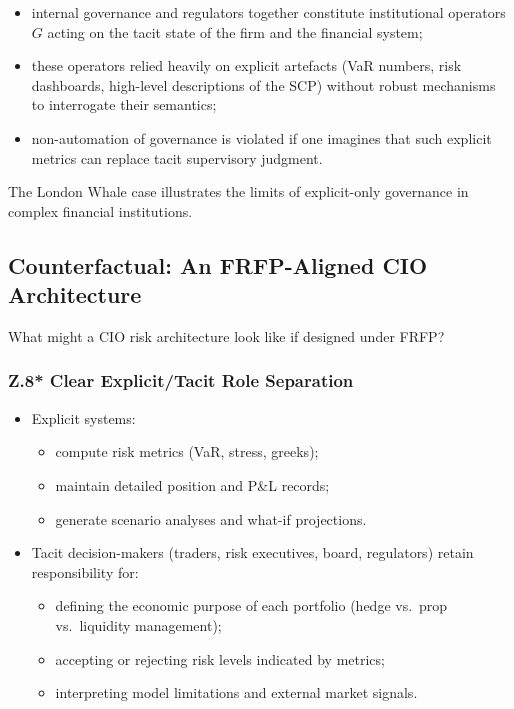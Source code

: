 \begin{itemize}
  \item internal governance and regulators together constitute institutional
        operators \(G\) acting on the tacit state of the firm and the
        financial system;
  \item these operators relied heavily on explicit artefacts (VaR numbers,
        risk dashboards, high-level descriptions of the SCP) without robust
        mechanisms to interrogate their semantics;
  \item non-automation of governance is violated if one imagines that such
        explicit metrics can replace tacit supervisory judgment.
\end{itemize}

The London Whale case illustrates the limits of explicit-only governance in
complex financial institutions.

\subsection{Counterfactual: An FRFP-Aligned CIO Architecture}

What might a CIO risk architecture look like if designed under FRFP?

\subsubsection*{Z.8* Clear Explicit/Tacit Role Separation}

\begin{itemize}
  \item Explicit systems:
        \begin{itemize}
          \item compute risk metrics (VaR, stress, greeks);
          \item maintain detailed position and P\&L records;
          \item generate scenario analyses and what-if projections.
        \end{itemize}
  \item Tacit decision-makers (traders, risk executives, board, regulators)
        retain responsibility for:
        \begin{itemize}
          \item defining the economic purpose of each portfolio (hedge vs.\
                prop vs.\ liquidity management);
          \item accepting or rejecting risk levels indicated by metrics;
          \item interpreting model limitations and external market signals.
        \end{itemize}
\end{itemize}

